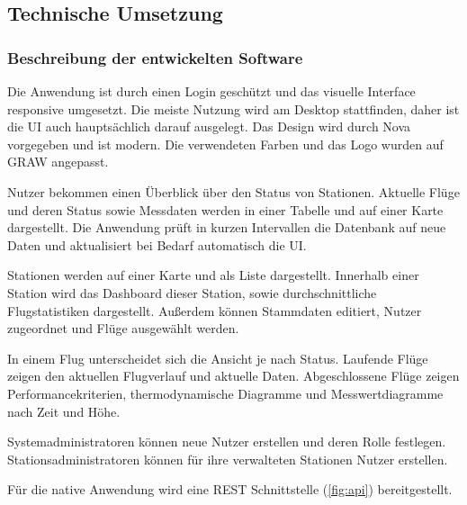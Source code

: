 \subsection{Technische Umsetzung}

\subsubsection{Beschreibung der entwickelten Software}

Die Anwendung ist durch einen Login geschützt und das visuelle Interface responsive umgesetzt.
Die meiste Nutzung wird am Desktop stattfinden, daher ist die UI auch hauptsächlich darauf ausgelegt.
Das Design wird durch Nova vorgegeben und ist modern.
Die verwendeten Farben und das Logo wurden auf GRAW angepasst.

Nutzer bekommen einen Überblick über den Status von Stationen.
Aktuelle Flüge und deren Status sowie Messdaten werden in einer Tabelle und auf einer Karte dargestellt.
Die Anwendung prüft in kurzen Intervallen die Datenbank auf neue Daten und aktualisiert bei Bedarf automatisch die UI.

Stationen werden auf einer Karte und als Liste dargestellt.
Innerhalb einer Station wird das Dashboard dieser Station, sowie durchschnittliche Flugstatistiken dargestellt.
Außerdem können Stammdaten editiert, Nutzer zugeordnet und Flüge ausgewählt werden.

In einem Flug unterscheidet sich die Ansicht je nach Status.
Laufende Flüge zeigen den aktuellen Flugverlauf und aktuelle Daten.
Abgeschlossene Flüge zeigen Performancekriterien, thermodynamische Diagramme und Messwertdiagramme nach Zeit und Höhe.

Systemadministratoren können neue Nutzer erstellen und deren Rolle festlegen.
Stationsadministratoren können für ihre verwalteten Stationen Nutzer erstellen.

\newpage

Für die native Anwendung wird eine REST Schnittstelle (\ref{fig:api}) bereitgestellt.

